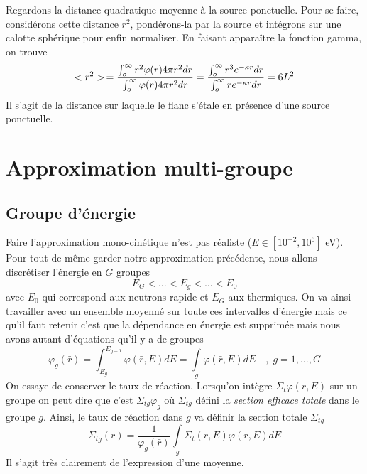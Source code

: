 Regardons la distance quadratique moyenne à la source ponctuelle. Pour se faire, considérons cette 
distance $r^2$, pondérons-la par la source et intégrons sur une calotte sphérique pour enfin 
normaliser. En faisant apparaître la fonction gamma, on trouve
\begin{equation}
\displaystyle < {r^2} > \, = \dfrac{{\int_o^\infty     {r^2}\varphi (r)4\pi {r^2}dr}}{{\int_o^\infty     \varphi (r)4\pi {r^2}dr}} = \dfrac{{\int_o^\infty     {r^3}{e^{ - \kappa r}}dr}}{{\int_o^\infty    r{e^{ - \kappa r}}dr}} = 6{L^2}
\end{equation}
Il s'agit de la distance sur laquelle le flanc s'étale en présence d'une source ponctuelle.


\section{Approximation multi-groupe}
\subsection{Groupe d'énergie}
Faire l'approximation mono-cinétique n'est pas réaliste ($E \in [10^{-2}, 10^6]$ eV). Pour tout de 
même garder notre approximation précédente, nous allons discrétiser l'énergie en $G$ groupes
\begin{equation}
E_G < \dots < E_g < \dots < E_0
\end{equation}
avec $E_0$ qui correspond aux neutrons rapide et $E_G$ aux thermiques. On va ainsi travailler avec un 
ensemble moyenné sur toute ces intervalles d'énergie mais ce qu'il faut retenir c'est que la 
dépendance en énergie est supprimée mais nous avons autant d'équations qu'il y a de groupes
\begin{equation}
{\varphi _g}(\bar r) = \int_{{E_g}}^{{E_{g - 1}}}    \varphi (\bar r,E)dE = \int\limits_g    \varphi (\bar r,E)dE\quad ,\;g = 1,\dots, G
\end{equation}
On essaye de conserver le taux de réaction. Lorsqu'on intègre $\Sigma_t\varphi(\bar r,E)$ sur 
un groupe on peut dire que c'est $\Sigma_{tg}\varphi_g$ où $\Sigma_{tg}$ défini la\textit{ section  efficace totale} dans le groupe $g$. Ainsi, le taux de réaction dans $g$ va définir la section totale $\Sigma_{tg}$
\begin{equation}
{\Sigma _{tg}}(\bar r) = \frac{1}{{{\varphi _g}(\bar r)}}\int\limits_g    {\Sigma _t}(\bar r,E)\varphi (\bar r,E)dE
\end{equation}
Il s'agit très clairement de l'expression d'une moyenne.\\

